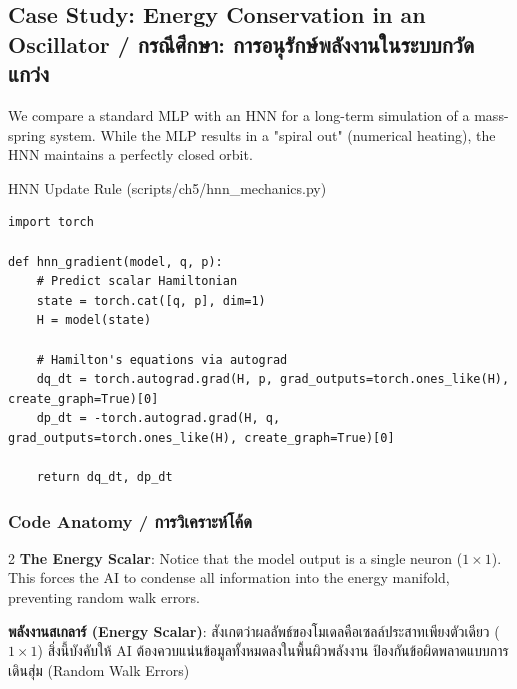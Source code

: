 \subsection{Case Study: Energy Conservation in an Oscillator \quad / \quad \textthai{กรณีศึกษา: การอนุรักษ์พลังงานในระบบกวัดแกว่ง}}
We compare a standard MLP with an HNN for a long-term simulation of a mass-spring system. While the MLP results in a "spiral out" (numerical heating), the HNN maintains a perfectly closed orbit.

\begin{pythonbox}{HNN Update Rule (scripts/ch5/hnn\_mechanics.py)}
\begin{lstlisting}
import torch

def hnn_gradient(model, q, p):
    # Predict scalar Hamiltonian
    state = torch.cat([q, p], dim=1)
    H = model(state)
    
    # Hamilton's equations via autograd
    dq_dt = torch.autograd.grad(H, p, grad_outputs=torch.ones_like(H), create_graph=True)[0]
    dp_dt = -torch.autograd.grad(H, q, grad_outputs=torch.ones_like(H), create_graph=True)[0]
    
    return dq_dt, dp_dt
\end{lstlisting}
\end{pythonbox}

\subsubsection*{Code Anatomy \quad / \quad \textthai{การวิเคราะห์โค้ด}}
\begin{paracol}{2}
\textbf{The Energy Scalar}: Notice that the model output is a single neuron ($1 \times 1$). This forces the AI to condense all information into the energy manifold, preventing random walk errors.

\switchcolumn

\begin{thai}
\textbf{พลังงานสเกลาร์ (Energy Scalar)}: สังเกตว่าผลลัพธ์ของโมเดลคือเซลล์ประสาทเพียงตัวเดียว ($1 \times 1$) สิ่งนี้บังคับให้ AI ต้องควบแน่นข้อมูลทั้งหมดลงในพื้นผิวพลังงาน ป้องกันข้อผิดพลาดแบบการเดินสุ่ม (Random Walk Errors)
\end{thai}
\end{paracol}

